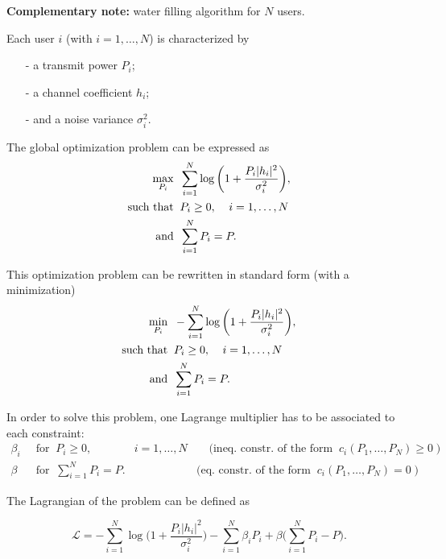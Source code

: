 \documentclass [a4paper, 11pt] {article}
\begin{document}
\begin{solution}
        
        \textbf{Complementary note:} water filling algorithm for $N$ users.
        
        
        Each user $i$ (with $i = 1,\hdots,N$) is characterized by 
        \begin{itemize}
            \item[-] a transmit power $P_i$;
            \item[-] a channel coefficient $h_i$;
            \item[-] and a noise variance $\sigma_i^2$.
        \end{itemize}
        
        The global optimization problem can be expressed as 
        \begin{align}
            \max_{P_i} \; \; & \sum_{i=1}^{N} \log\bigg(1 + \frac{P_i |h_i|^2}{\sigma_i^2} \bigg)  ,\\
            \text{\normalfont such that} \; \;  & P_i \geq 0, \; \; \; \;  i = 1,\hdots,N \\
            \text{and}\; \; & \sum_{i=1}^{N} P_i = P.  
        \end{align}
        
        
        This optimization problem can be rewritten in standard form (with a minimization)
        \begin{align}
            \min_{P_i} \; \; & -\sum_{i=1}^{N} \log\bigg(1 + \frac{P_i |h_i|^2}{\sigma_i^2} \bigg) , \\
            \text{\normalfont such that} \; \;  & P_i \geq 0, \; \; \; \;  i = 1,\hdots,N\\
            \text{and}\; \; & \sum_{i=1}^{N} P_i = P . 
        \end{align}
        
        In order to solve this problem, one Lagrange multiplier has to be associated to each constraint:
        \begin{align}
            \beta_i & \; \; \text{for} \; \; P_i \geq 0, \; \; & i = 1,\hdots,N & \; \; \; \; \text{(ineq. constr. of the form} \; \; c_i(P_1,\hdots,P_N) \geq 0 \; )\\
            \beta & \; \; \text{for} \; \; \sum_{i=1}^{N}P_i=P. & & \text{(eq. constr. of the form} \; \; c_i(P_1,\hdots,P_N) = 0 \; )
        \end{align}
        
        
        The Lagrangian of the problem can be defined as 
        
        \begin{equation}
            \mathcal{L} = -\sum_{i=1}^{N} \log\bigg(1 + \frac{P_i |h_i|^2}{\sigma_i^2} \bigg) - \sum_{i=1}^{N} \beta_i P_i + \beta \Big(\sum_{i=1}^{N}P_i - P \Big). 
        \end{equation}
        

\end{solution}
\end{document}
